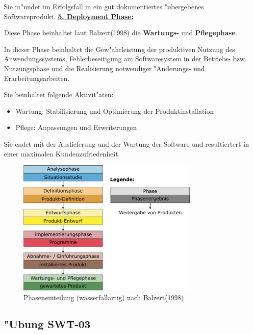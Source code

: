 Sie m"undet im Erfolgsfall in ein gut dokumentiertes "ubergebenes Softwareprodukt.
\bigbreak
\underline{\textbf{5. Deployment Phase:}}
\smallbreak

Diese Phase beinhaltet laut Balzert(1998)\supercite{Balzert1998} die \textbf{Wartungs-} und \textbf{Pflegephase}.

In dieser Phase beinhaltet die Gew"ahrleistung der produktiven Nutzung des Anwendungssystems, Fehlerbeseitigung am Softwaresystem in der Betriebs- bzw. Nutzungsphase und die Realisierung notwendiger "Anderungs- und Erarbeitungsarbeiten.

Sie beinhaltet folgende Aktivit"aten:
\begin{itemize}
  \item Wartung: Stabilisierung und Optimierung der Produktinstallation
  \item Pflege: Anpassungen und Erweiterungen
\end{itemize}

Sie endet mit der Auslieferung und der Wartung der Software und resultiertert in einer maximalen Kundenzufriedenheit.
\begin{figure}[H]
  \centering
  \includegraphics[width=0.8\textwidth]{./images/AbbPhaseneinteilung.png}
  \captionsetup{name=Abb.,font=footnotesize}
  \caption{Phaseneinteilung (wasserfallartig) nach Balzert(1998)\supercite{Balzert1998}}
\end{figure}


\newpage
\subsection{"Ubung SWT-03}
